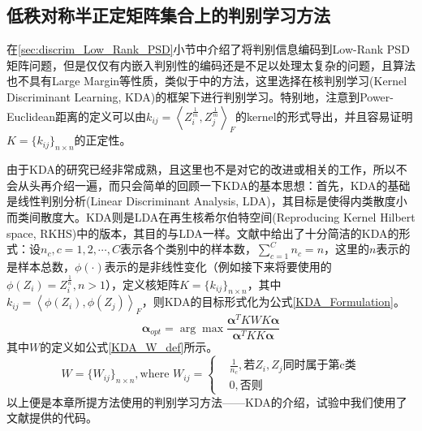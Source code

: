 \subsection{低秩对称半正定矩阵集合上的判别学习方法}
在\ref{sec:discrim_Low_Rank_PSD}小节中介绍了将判别信息编码到Low-Rank PSD矩阵问题，但是仅仅有内嵌入判别性的编码还是不足以处理太复杂的问题，且算法也不具有Large Margin等性质，类似于\cite{PSD_WACV}中的方法，这里选择在核判别学习(Kernel Discriminant Learning, KDA\cite{Kernel_KDA})的框架下进行判别学习。特别地，注意到Power-Euclidean距离的定义可以由$k_{ij}=\left<Z_{i}^{\frac{1}{m}},Z_{j}^{\frac{1}{m}}\right>_{F}$的kernel的形式导出，并且容易证明$K=\{k_{ij}\}_{n\times  n}$的正定性。

由于KDA\cite{Kernel_KDA}的研究已经非常成熟，且这里也不是对它的改进或相关的工作，所以不会从头再介绍一遍，而只会简单的回顾一下KDA的基本思想：首先，KDA的基础是线性判别分析(Linear Discriminant Analysis, LDA)，其目标是使得内类散度小而类间散度大。KDA则是LDA在再生核希尔伯特空间(Reproducing Kernel Hilbert space, RKHS)中的版本，其目的与LDA一样。文献\cite{Kernel_KDA}中给出了十分简洁的KDA的形式：设$n_c,c=1,2,\cdots,C$表示各个类别中的样本数，$\sum_{c=1}^{C}n_{c}=n$，这里的$n$表示的是样本总数，$\phi(\cdot)$表示的是非线性变化（例如接下来将要使用的$\phi(Z_{i})=Z_{i}^{\frac{1}{n}},n>1$），定义核矩阵$K=\{k_{ij}\}_{n\times n}$，其中$k_{ij}=\left<\phi(Z_{i}),\phi(Z_j)\right>_{F}$，则KDA的目标形式化为公式\ref{KDA_Formulation}。
\begin{equation}
\label{KDA_Formulation}
\bm{\alpha}_{opt}=\arg \max\frac{\bm{\alpha}^{T}KWK\bm{\alpha}}{\bm{\alpha}^{T}KK\bm{\alpha}}
\end{equation}
其中$W$的定义如公式\ref{KDA_W_def}所示。
\begin{equation}
\label{KDA_W_def}
W=\{W_{ij}\}_{n \times n},\text{where }W_{ij}=\left\{
\begin{split}
&\frac{1}{n_{c}},\text{若$Z_{i},Z_{j}$同时属于第c类}\\
&0, \text{否则}
\end{split}
\right.
\end{equation}
以上便是本章所提方法使用的判别学习方法——KDA\cite{Kernel_KDA}的介绍，试验中我们使用了文献\cite{KDA_DengCai1,KDA_DengCai2}提供的代码。
